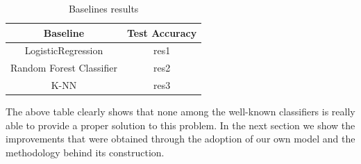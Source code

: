 \documentclass[10pt,conference,compsocconf]{IEEEtran}
\begin{document}
\begin{table}
\caption{Baselines results}
\label{tab:baselineres}
\begin{tabular}{ | c | c | }
\hline
Baseline & Test Accuracy  \\
\hline
LogisticRegression & res1 \\
\hline
Random Forest Classifier & res2 \\
\hline
K-NN & res3 \\
\hline
\end{tabular}
\end{table}


The above table clearly shows that none among the well-known classifiers is really able to provide a proper solution to this problem. In the next section we show the improvements that were obtained through the adoption of our own model and the methodology behind its construction. 
\end{document}
